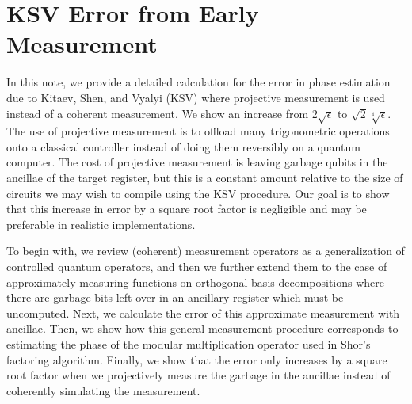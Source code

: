 \chapter{KSV Error from Early Measurement}
\label{app:ksv-error}

In this note, we provide a detailed calculation for the error in
phase estimation due to Kitaev, Shen, and Vyalyi (KSV) where projective
measurement is used instead of a coherent measurement. We show an
increase from $2\sqrt{\epsilon}$ to $\sqrt{2}\sqrt[4]{\epsilon}$. The use
of projective measurement is to offload many trigonometric operations
onto a classical controller instead of doing them reversibly on a quantum
computer. The cost of projective measurement is leaving garbage qubits in
the ancillae of the target register, but this is a constant amount relative to
the size of circuits we may wish to compile using the KSV procedure.
Our goal is to show that this increase in error by a square root
factor is negligible and may be preferable in realistic implementations.

To begin with, we review (coherent) measurement operators as a generalization of
controlled quantum operators, and then we further extend them to the case
of approximately measuring functions on orthogonal basis decompositions
where there are garbage bits left over in an ancillary register which must
be uncomputed.
Next, we calculate the error of this approximate measurement with ancillae.
Then, we show how this general measurement procedure corresponds to
estimating the phase of the modular multiplication operator used in
Shor's factoring algorithm. Finally, we show that the error only
increases by a square root factor when we projectively measure the garbage
in the ancillae instead of coherently simulating the measurement.






